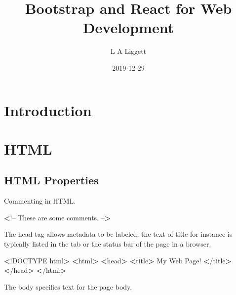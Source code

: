 \documentclass[]{book}
\title{Bootstrap and React for Web Development}
\author{L A Liggett}
\date{2019-12-29}
\newenvironment{Shaded}{\begin{snugshade}}{\end{snugshade}}
\newcommand{\ExtensionTok}[1]{#1}
\newcommand{\FunctionTok}[1]{\textcolor[rgb]{0.00,0.00,0.00}{#1}}
\newcommand{\NormalTok}[1]{#1}
\newcommand{\OperatorTok}[1]{\textcolor[rgb]{0.81,0.36,0.00}{\textbf{#1}}}
\begin{document}
\maketitle

{
\setcounter{tocdepth}{1}
\tableofcontents
}
\hypertarget{introduction}{%
\chapter{Introduction}\label{introduction}}

\hypertarget{html}{%
\chapter{HTML}\label{html}}

\hypertarget{html-properties}{%
\section{HTML Properties}\label{html-properties}}

Commenting in HTML.

\begin{Shaded}
\begin{Highlighting}[]
\OperatorTok{<}\NormalTok{!}\ExtensionTok{--}
\ExtensionTok{These}\NormalTok{ are some comments.}
\ExtensionTok{--}\OperatorTok{>}
\end{Highlighting}
\end{Shaded}

The head tag allows metadata to be labeled, the text of title for instance is typically listed in the tab or the status bar of the page in a browser.

\begin{Shaded}
\begin{Highlighting}[]
\OperatorTok{<}\NormalTok{!}\ExtensionTok{DOCTYPE}\NormalTok{ html}\OperatorTok{>}         
\OperatorTok{<}\ExtensionTok{html}\OperatorTok{>}                  
    \OperatorTok{<}\FunctionTok{head}\OperatorTok{>}              
        \OperatorTok{<}\ExtensionTok{title}\OperatorTok{>}         
            \ExtensionTok{My}\NormalTok{ Web Page!}
        \OperatorTok{<}\NormalTok{/}\ExtensionTok{title}\OperatorTok{>}        
    \OperatorTok{<}\NormalTok{/}\ExtensionTok{head}\OperatorTok{>}             
\OperatorTok{<}\NormalTok{/}\ExtensionTok{html}\OperatorTok{>}                 
\end{Highlighting}
\end{Shaded}

The body specifies text for the page body.
\end{document}
